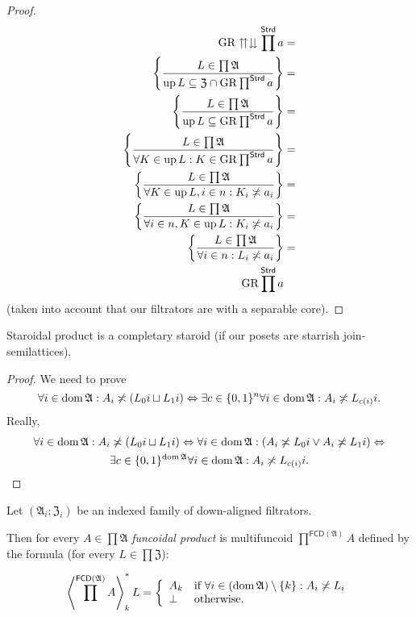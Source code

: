 \begin{proof}
~
\begin{align*}
\operatorname{GR}\upuparrows\downdownarrows\prod^{\mathsf{Strd}}a & =\\
\left\{ \frac{L\in\prod\mathfrak{A}}{\operatorname{up} L\subseteq\mathfrak{Z}\cap\operatorname{GR}\prod^{\mathsf{Strd}}a}\right\} & =\\
\left\{ \frac{L\in\prod\mathfrak{A}}{\operatorname{up} L\subseteq\operatorname{GR}\prod^{\mathsf{Strd}}a}\right\} & =\\
\left\{ \frac{L\in\prod\mathfrak{A}}{\forall K\in\operatorname{up} L:K\in\operatorname{GR}\prod^{\mathsf{Strd}}a}\right\} & =\\
\left\{ \frac{L\in\prod\mathfrak{A}}{\forall K\in\operatorname{up} L,i\in n:K_{i}\not\asymp a_{i}}\right\} & =\\
\left\{ \frac{L\in\prod\mathfrak{A}}{\forall i\in n,K\in\operatorname{up} L:K_{i}\not\asymp a_{i}}\right\} & =\\
\left\{ \frac{L\in\prod\mathfrak{A}}{\forall i\in n:L_{i}\not\asymp a_{i}}\right\} & =\\
\operatorname{GR}\prod^{\mathsf{Strd}}a
\end{align*}
(taken into account that our filtrators are with a separable core).\end{proof}
\begin{thm}
Staroidal product is a completary staroid (if our posets are starrish
join-semilattices).\end{thm}
\begin{proof}
We need to prove 
\[
\forall i\in\operatorname{dom}\mathfrak{A}:A_{i}\not\asymp(L_{0}i\sqcup L_{1}i)\Leftrightarrow\exists c\in\{0,1\}^{n}\forall i\in\operatorname{dom}\mathfrak{A}:A_{i}\not\asymp L_{c(i)}i.
\]
Really, 
\begin{multline*}
\forall i\in\operatorname{dom}\mathfrak{A}:A_{i}\not\asymp(L_{0}i\sqcup L_{1}i)\Leftrightarrow\forall i\in\operatorname{dom}\mathfrak{A}:(A_{i}\not\asymp L_{0}i\vee A_{i}\not\asymp L_{1}i)\Leftrightarrow\\
\exists c\in\{0,1\}^{\operatorname{dom}\mathfrak{A}}\forall i\in\operatorname{dom}\mathfrak{A}:A_{i}\not\asymp L_{c(i)}i.
\end{multline*}
\end{proof}
\begin{defn}
Let $(\mathfrak{A}_{i};\mathfrak{Z}_{i})$
be an indexed family of down-aligned filtrators.

Then for every $A\in\prod\mathfrak{A}$ \emph{funcoidal product} is
multifuncoid $\prod^{\mathsf{FCD}(\mathfrak{A})}A$ defined by the
formula (for every $L\in\prod\mathfrak{Z}$):

\[
\left\langle \prod^{\mathsf{FCD}(\mathfrak{A})}A\right\rangle ^{\ast}_{k}L=\left\{ \begin{array}{ll}
A_{k} & \text{if }\forall i\in(\operatorname{dom}\mathfrak{A})\setminus\{k\}:A_{i}\not\asymp L_{i}\\
\bot & \text{otherwise}.
\end{array}\right.
\]
\end{defn}
